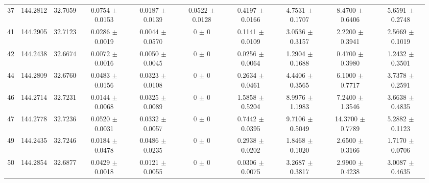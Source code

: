 \begin{table*}
\begin{adjustbox}{width=\textwidth, center}
\begin{tabular}{cccccccccc}
        37 &144.2812 & 32.7059 & 0.0754 $\pm$ 0.0153 & 0.0187 $\pm$ 0.0139 & 0.0522 $\pm$ 0.0128 & 0.4197 $\pm$ 0.0166 & 4.7531 $\pm$ 0.1707 & 8.4700 $\pm$ 0.6406 & 5.6591 $\pm$ 0.2748 \\
        41 &144.2905 & 32.7123 & 0.0286 $\pm$ 0.0019 & 0.0044 $\pm$ 0.0570 & 0 $\pm$ 0 & 0.1141 $\pm$ 0.0109 & 3.0536 $\pm$ 0.3157 & 2.2200 $\pm$ 0.3941 & 2.5669 $\pm$ 0.1019 \\
        42 &144.2438 & 32.6674 & 0.0072 $\pm$ 0.0016 & 0.0050 $\pm$ 0.0045 & 0 $\pm$ 0 & 0.0256 $\pm$ 0.0064 & 1.2904 $\pm$ 0.1688 & 0.4700 $\pm$ 0.3980 & 1.2432 $\pm$ 0.3501 \\
        44 &144.2809 & 32.6760 & 0.0483 $\pm$ 0.0156 & 0.0323 $\pm$ 0.0108 & 0 $\pm$ 0 & 0.2634 $\pm$ 0.0461 & 4.4406 $\pm$ 0.3565 & 6.1000 $\pm$ 0.7717 & 3.7378 $\pm$ 0.2591 \\
        46 &144.2714 & 32.7231 & 0.0144 $\pm$ 0.0068 & 0.0325 $\pm$ 0.0089 & 0 $\pm$ 0 & 1.5858 $\pm$ 0.5204 & 8.9976 $\pm$ 1.1983 & 7.2400 $\pm$ 1.3546 & 3.6638 $\pm$ 0.4835 \\
        47 &144.2778 & 32.7236 & 0.0520 $\pm$ 0.0031 & 0.0332 $\pm$ 0.0057 & 0 $\pm$ 0 & 0.7442 $\pm$ 0.0395 & 9.7106 $\pm$ 0.5049 & 14.3700 $\pm$ 0.7789 & 5.2882 $\pm$ 0.1123 \\
        49 &144.2435 & 32.7246 & 0.0184 $\pm$ 0.0478 & 0.0486 $\pm$ 0.0235 & 0 $\pm$ 0 & 0.2938 $\pm$ 0.0202 & 1.8468 $\pm$ 0.1020 & 2.6500 $\pm$ 0.3166 & 1.7170 $\pm$ 0.0706 \\
        50 &144.2854 & 32.6877 & 0.0429 $\pm$ 0.0018 & 0.0121 $\pm$ 0.0055 & 0 $\pm$ 0 & 0.0306 $\pm$ 0.0075 & 3.2687 $\pm$ 0.3817 & 2.9900 $\pm$ 0.4238 & 3.0087 $\pm$ 0.4635 \\
        \hline
    \end{tabular}
  \end{adjustbox}  
    \label{tab:IR_intensity}
\end{table*}

